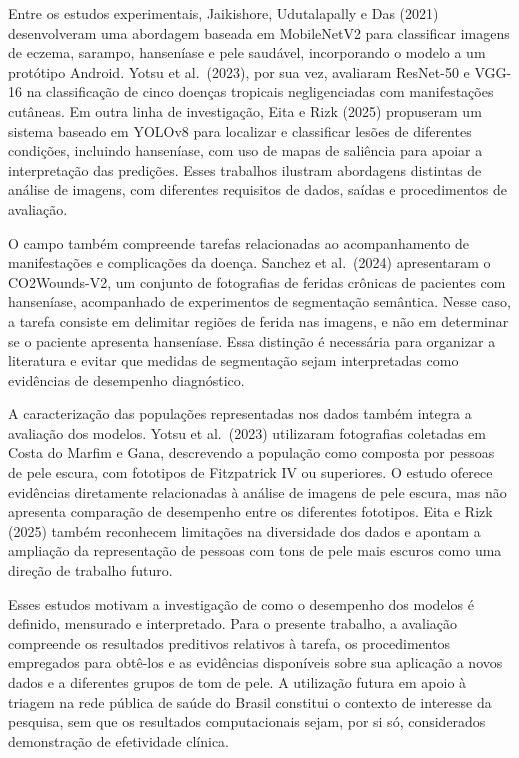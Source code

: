 \documentclass[
]{article}
\begin{document}
Entre os estudos experimentais, Jaikishore, Udutalapally e Das (2021)
desenvolveram uma abordagem baseada em MobileNetV2 para classificar
imagens de eczema, sarampo, hanseníase e pele saudável, incorporando o
modelo a um protótipo Android. Yotsu et al.~(2023), por sua vez,
avaliaram ResNet-50 e VGG-16 na classificação de cinco doenças tropicais
negligenciadas com manifestações cutâneas. Em outra linha de
investigação, Eita e Rizk (2025) propuseram um sistema baseado em YOLOv8
para localizar e classificar lesões de diferentes condições, incluindo
hanseníase, com uso de mapas de saliência para apoiar a interpretação
das predições. Esses trabalhos ilustram abordagens distintas de análise
de imagens, com diferentes requisitos de dados, saídas e procedimentos
de avaliação.

O campo também compreende tarefas relacionadas ao acompanhamento de
manifestações e complicações da doença. Sanchez et al.~(2024)
apresentaram o CO2Wounds-V2, um conjunto de fotografias de feridas
crônicas de pacientes com hanseníase, acompanhado de experimentos de
segmentação semântica. Nesse caso, a tarefa consiste em delimitar
regiões de ferida nas imagens, e não em determinar se o paciente
apresenta hanseníase. Essa distinção é necessária para organizar a
literatura e evitar que medidas de segmentação sejam interpretadas como
evidências de desempenho diagnóstico.

A caracterização das populações representadas nos dados também integra a
avaliação dos modelos. Yotsu et al.~(2023) utilizaram fotografias
coletadas em Costa do Marfim e Gana, descrevendo a população como
composta por pessoas de pele escura, com fototipos de Fitzpatrick IV ou
superiores. O estudo oferece evidências diretamente relacionadas à
análise de imagens de pele escura, mas não apresenta comparação de
desempenho entre os diferentes fototipos. Eita e Rizk (2025) também
reconhecem limitações na diversidade dos dados e apontam a ampliação da
representação de pessoas com tons de pele mais escuros como uma direção
de trabalho futuro.

Esses estudos motivam a investigação de como o desempenho dos modelos é
definido, mensurado e interpretado. Para o presente trabalho, a
avaliação compreende os resultados preditivos relativos à tarefa, os
procedimentos empregados para obtê-los e as evidências disponíveis sobre
sua aplicação a novos dados e a diferentes grupos de tom de pele. A
utilização futura em apoio à triagem na rede pública de saúde do Brasil
constitui o contexto de interesse da pesquisa, sem que os resultados
computacionais sejam, por si só, considerados demonstração de
efetividade clínica.
\end{document}
